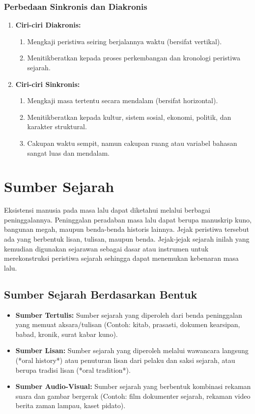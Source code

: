 \documentclass[12pt, a4paper]{article}
\begin{document}
\subsubsection{Perbedaan Sinkronis dan Diakronis} 
\begin{enumerate}
	\item \textbf{Ciri-ciri Diakronis:}
		\begin{enumerate}
			\item Mengkaji peristiwa seiring berjalannya waktu (bersifat vertikal).
			\item Menitikberatkan kepada proses perkembangan dan kronologi peristiwa sejarah.
		\end{enumerate}
	\item \textbf{Ciri-ciri Sinkronis:}
		\begin{enumerate}
			\item Mengkaji masa tertentu secara mendalam (bersifat horizontal).
			\item Menitikberatkan kepada kultur, sistem sosial, ekonomi, politik, dan karakter struktural.
			\item Cakupan waktu sempit, namun cakupan ruang atau variabel bahasan sangat luas dan mendalam.
		\end{enumerate}
\end{enumerate}

\section{Sumber Sejarah}
Eksistensi manusia pada masa lalu dapat diketahui melalui berbagai peninggalannya. Peninggalan peradaban masa lalu dapat berupa manuskrip kuno, bangunan megah, maupun benda-benda historis lainnya. Jejak peristiwa tersebut ada yang berbentuk lisan, tulisan, maupun benda. Jejak-jejak sejarah inilah yang kemudian digunakan sejarawan sebagai dasar atau instrumen untuk merekonstruksi peristiwa sejarah sehingga dapat menemukan kebenaran masa lalu.

\subsection{Sumber Sejarah Berdasarkan Bentuk}
\begin{itemize}
	\item \textbf{Sumber Tertulis:} Sumber sejarah yang diperoleh dari benda peninggalan yang memuat aksara/tulisan (Contoh: kitab, prasasti, dokumen kearsipan, babad, kronik, surat kabar kuno).
	\item \textbf{Sumber Lisan:} Sumber sejarah yang diperoleh melalui wawancara langsung (*oral history*) atau penuturan lisan dari pelaku dan saksi sejarah, atau berupa tradisi lisan (*oral tradition*).
	\item \textbf{Sumber Audio-Visual:} Sumber sejarah yang berbentuk kombinasi rekaman suara dan gambar bergerak (Contoh: film dokumenter sejarah, rekaman video berita zaman lampau, kaset pidato).
\end{itemize}
\end{document}
